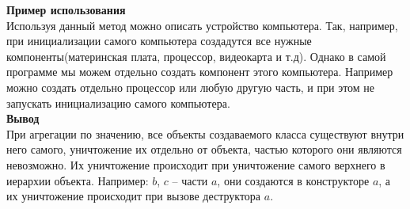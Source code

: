 \documentclass[12pt]{report}
\begin{document}
    \textbf{Пример использования}\\
    Используя данный метод можно описать устройство компьютера. Так, например, при инициализации 
    самого компьютера создадутся все нужные компоненты(материнская плата, процессор, видеокарта и т.д).
    Однако в самой программе мы можем отдельно создать компонент этого компьютера.
    Например можно создать отдельно процессор или любую другую часть, и при этом не запускать инициализацию самого компьютера.\\
    \textbf{Вывод}\\
    При агрегации по значению, все объекты создаваемого класса существуют внутри него самого, 
    уничтожение их отдельно от объекта, частью которого они являются невозможно. 
    Их уничтожение происходит при уничтожение самого верхнего в иерархии объекта. 
    Например: $b$, $c$ – части $a$, они создаются в конструкторе $a$, а их уничтожение происходит при вызове деструктора $a$.\\
\end{document}
